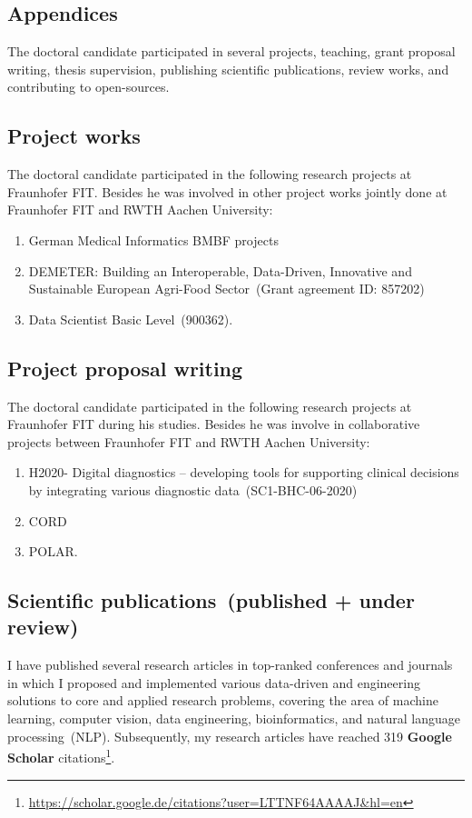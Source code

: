 \begin{appendices}
\section*{Appendices}
The doctoral candidate participated in several projects, teaching, grant proposal writing, thesis supervision, publishing scientific publications, review works, and contributing to open-sources. 

\subsection*{Project works}
The doctoral candidate participated in the following research projects at Fraunhofer FIT. Besides he was involved in other project works jointly done at Fraunhofer FIT and RWTH Aachen University:

\begin{enumerate}[noitemsep]
    \item German Medical Informatics BMBF projects
    \item DEMETER: Building an Interoperable, Data-Driven, Innovative and Sustainable European Agri-Food Sector~(Grant agreement ID: 857202)
    \item Data Scientist Basic Level~(900362). 
\end{enumerate}  

\subsection*{Project proposal writing}
The doctoral candidate participated in the following research projects at Fraunhofer FIT during his studies. Besides he was involve in collaborative projects between Fraunhofer FIT and RWTH Aachen University: 

\begin{enumerate}[noitemsep]
    \item H2020- Digital diagnostics – developing tools for supporting clinical decisions by integrating various diagnostic data~(SC1-BHC-06-2020)
    \item CORD
    \item POLAR.
\end{enumerate}  

\subsection*{Scientific publications~(published + under review)}
I have published several research articles in top-ranked conferences and journals in which I proposed and implemented various data-driven and engineering solutions to core and applied research problems, covering the area of machine learning, computer vision, data engineering, bioinformatics, and natural language processing~(NLP). Subsequently, my research articles have reached 319 \textbf{Google Scholar} citations\footnote{\url{https://scholar.google.de/citations?user=LTTNF64AAAAJ&hl=en}}. 


\end{appendices}
